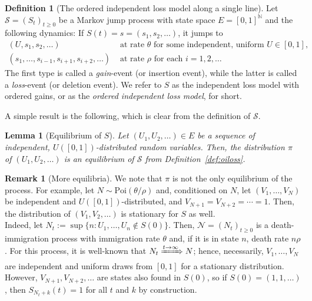 \documentclass[preprint,authoryear]{elsarticle}
\newtheorem{lemma}[proposition]{Lemma}
\theoremstyle{definition}
\newtheorem{definition}[proposition]{Definition}
\newtheorem{remark}[proposition]{Remark}
\numberwithin{equation}{section}
\numberwithin{figure}{section}
\begin{document}
\begin{definition}[The ordered independent loss model along a single line\label{def:oiloss}]
  Let $\mathcal S = (S_t)_{t\geq 0}$ be a Markov jump process with
  state space $E = [0,1]^{\mathbb N}$ and the following dynamics: If
  $S(t) = s = (s_1, s_2,\dots)$, it jumps to
  \begin{align*}
    (U, s_1, s_2,\dots) &\text{ at rate  } \theta \text{ for some independent, uniform $U\in[0,1]$},\\
    (s_1,\dots,s_{i-1}, s_{i+1},s_{i+2},\dots) & \text{ at rate } \rho \text{ for each $i=1,2,\dots$}
  \end{align*}
  The first type is called a {\em gain}-event (or insertion event), while the latter is called a {\em loss}-event (or deletion event).
  We refer to $S$ as the independent loss model with ordered gains, or as the \emph{ordered independent loss model}, for short. 
  
\end{definition}

\noindent
A simple result is the following, which is clear from the definition
of $\mathcal S$.

\begin{lemma}[Equilibrium of $S$\label{l:seq}]
  Let $(U_1, U_2,\dots)\in E$ be a sequence of independent,
  $U([0,1])$-distributed random variables. Then, the distribution
  $\pi$ of $(U_1, U_2,\dots)$ is an equilibrium of $\mathcal S$ from
  Definition~\ref{def:oiloss}.
\end{lemma}

\begin{remark}[More equilibria\label{rem:more}]
  We note that $\pi$ is not the only equilibrium of the process. For
  example, let $N \sim \text{Poi}(\theta/\rho)$ and, conditioned on
  $N$, let $(V_1,\dots,V_N)$ be independent and $U([0,1])$-distributed,
  and $V_{N+1} = V_{N+2}=\cdots =1$. Then, the distribution of
  $(V_1,V_2,\dots)$ is stationary for $S$ as well.\\
  Indeed, let $N_t:=\sup\{n: U_1,\dots,U_n\notin S(0)\}$. Then,
  $\mathcal N=(N_t)_{t\geq 0}$ is a death-immigration process with immigration
  rate $\theta$ and, if it is in state $n$, death rate
  $n\rho$. For this process, it is well-known that
  $N_t\xRightarrow{t\to\infty}N$; hence, necessarily, $V_1,\dots,V_N$ are
  independent and uniform draws from $[0,1]$ for a stationary
  distribution. However, $V_{N+1},V_{N+2},\dots$ are states also found
  in $S(0)$, so if $S(0)=(1,1,\dots)$, then $S_{N_t+k}(t)=1$ for all $t$
  and $k$ by construction.
\end{remark}
\end{document}
